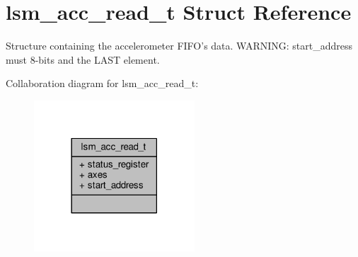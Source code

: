 \hypertarget{structlsm__acc__read__t}{\section{lsm\+\_\+acc\+\_\+read\+\_\+t Struct Reference}
\label{structlsm__acc__read__t}
}


Structure containing the accelerometer F\+I\+F\+O's data. W\+A\+R\+N\+I\+N\+G\+: start\+\_\+address must 8-\/bits and the L\+A\+S\+T element.  




Collaboration diagram for lsm\+\_\+acc\+\_\+read\+\_\+t\+:
\nopagebreak
\begin{figure}[H]
\begin{center}
\leavevmode
\includegraphics[width=170pt]{structlsm__acc__read__t__coll__graph}
\end{center}
\end{figure}
